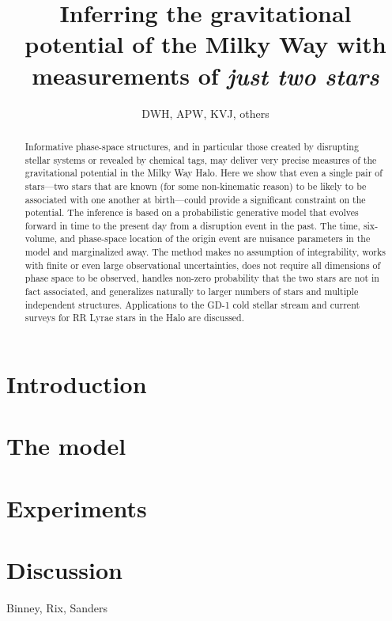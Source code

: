 \documentclass[letterpaper,12pt,preprint]{aastex}
\begin{document}
\title{Inferring the gravitational potential of the Milky Way with measurements of \emph{just two stars}}
\author{DWH, APW, KVJ, others}

\begin{abstract}
Informative phase-space structures, and in particular those created by
disrupting stellar systems or revealed by chemical tags, may deliver
very precise measures of the gravitational potential in the Milky Way
Halo.  Here we show that even a single pair of stars---two stars that
are known (for some non-kinematic reason) to be likely to be
associated with one another at birth---could provide a significant
constraint on the potential.  The inference is based on a
probabilistic generative model that evolves forward in time to the
present day from a disruption event in the past.  The time,
six-volume, and phase-space location of the origin event are nuisance
parameters in the model and marginalized away.  The method makes no
assumption of integrability, works with finite or even large
observational uncertainties, does not require all dimensions of phase
space to be observed, handles non-zero probability that the two stars
are not in fact associated, and generalizes naturally to larger
numbers of stars and multiple independent structures.  Applications to
the GD-1 cold stellar stream and current surveys for RR Lyrae stars in
the Halo are discussed.
\end{abstract}


\section{Introduction}

\section{The model}

\section{Experiments}

\section{Discussion}

\acknowledgements
Binney, Rix, Sanders
\end{document}

